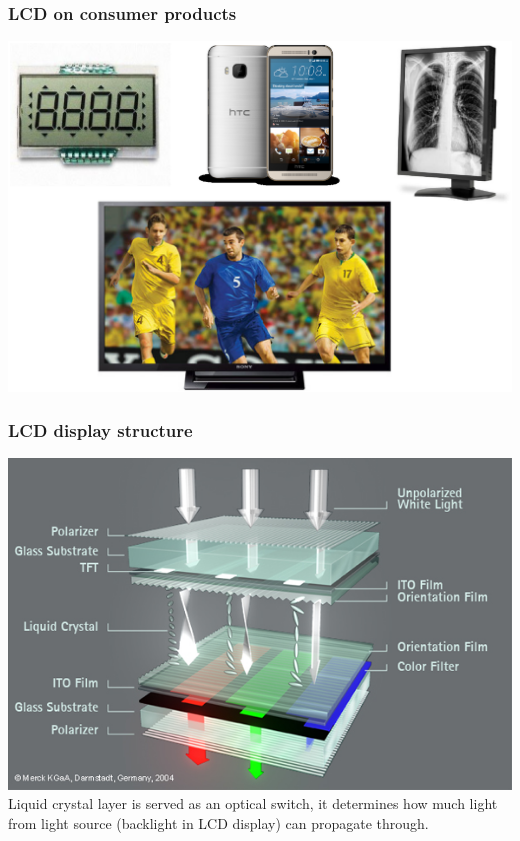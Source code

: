 \documentclass{beamer}
\begin{document}
\begin{frame}
\frametitle{LCD on consumer products}
\begin{center}
\includegraphics[scale=0.4]{LCD_Consumers.eps}
\end{center}
\end{frame}
\begin{frame}
\frametitle{LCD display structure}
\begin{center}
\includegraphics[scale=0.4]{LCD_Infografik_ENG_580_tcm1113_40163.jpg}
\\
Liquid crystal layer is served as an optical switch, it determines how much light from light source (backlight in LCD display) can propagate through.
\end{center}
\end{frame}
\end{document}
